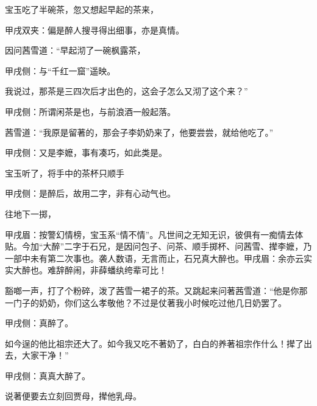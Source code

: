 \begin{parag}
    宝玉吃了半碗茶，忽又想起早起的茶来，\begin{note}甲戌双夹：偏是醉人搜寻得出细事，亦是真情。\end{note}因问茜雪道：“早起沏了一碗枫露茶，\begin{note}甲戌侧：与“千红一窟”遥映。\end{note}我说过，那茶是三四次后才出色的，这会子怎么又沏了这个来？”\begin{note}甲戌侧：所谓闲茶是也，与前浪酒一般起落。\end{note}茜雪道：“我原是留著的，那会子李奶奶来了，他要尝尝，就给他吃了。”\begin{note}甲戌侧：又是李嬷，事有凑巧，如此类是。\end{note}宝玉听了，将手中的茶杯只顺手\begin{note}甲戌侧：是醉后，故用二字，非有心动气也。\end{note}往地下一掷，\begin{note}甲戌眉：按警幻情榜，宝玉系“情不情”。凡世间之无知无识，彼俱有一痴情去体贴。今加“大醉”二字于石兄，是因问包子、问茶、顺手掷杯、问茜雪、撵李嬷，乃一部中未有第二次事也。袭人数语，无言而止，石兄真大醉也。甲戌眉：余亦云实实大醉也。难辞醉闹，非薛蟠纨绔辈可比！\end{note}豁啷一声，打了个粉碎，泼了茜雪一裙子的茶。又跳起来问著茜雪道：“他是你那一门子的奶奶，你们这么孝敬他？不过是仗著我小时候吃过他几日奶罢了。\begin{note}甲戌侧：真醉了。\end{note}如今逞的他比祖宗还大了。如今我又吃不著奶了，白白的养著祖宗作什么！撵了出去，大家干净！”\begin{note}甲戌侧：真真大醉了。\end{note}说著便要去立刻回贾母，撵他乳母。
\end{parag}


